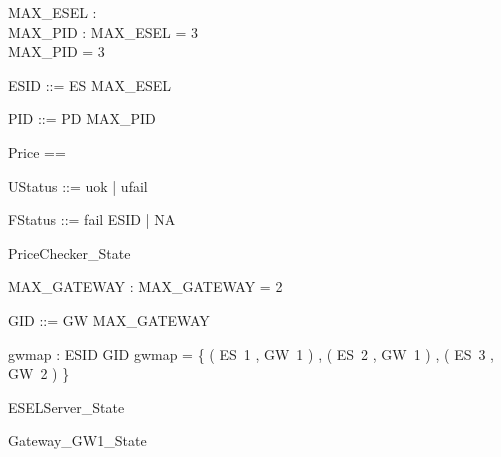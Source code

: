 \documentclass{article}
\begin{document}

\begin{axdef}
	MAX\_ESEL : \nat \\
 MAX\_PID : \nat 
\where
 MAX\_ESEL = 3 \\
 MAX\_PID = 3
\end{axdef}

\begin{zed}
	ESID ::= ES  \upto MAX\_ESEL \rdata
\end{zed}

\begin{zed}
	PID ::= PD  \upto MAX\_PID \rdata
\end{zed}

\begin{zed}
	Price == \nat
\end{zed}

\begin{zed}
	UStatus ::= uok | ufail
\end{zed}

\begin{zed}
	FStatus ::= fail \ldata ESID \rdata | NA
\end{zed}

\begin{zed}
	PriceChecker\_State 
\end{zed}

\begin{axdef}
	MAX\_GATEWAY : \nat 
\where
 MAX\_GATEWAY = 2
\end{axdef}

\begin{zed}
	GID ::= GW  \upto MAX\_GATEWAY \rdata
\end{zed}

\begin{axdef}
	gwmap : ESID \fun GID 
\where
 gwmap = \{ ( ES~1 , GW~1 ) , ( ES~2 , GW~1 ) , ( ES~3 , GW~2 ) \}
\end{axdef}

\begin{zed}
	ESELServer\_State 
\end{zed}

\begin{zed}
	Gateway\_GW1\_State 
\end{zed}
\end{document}
